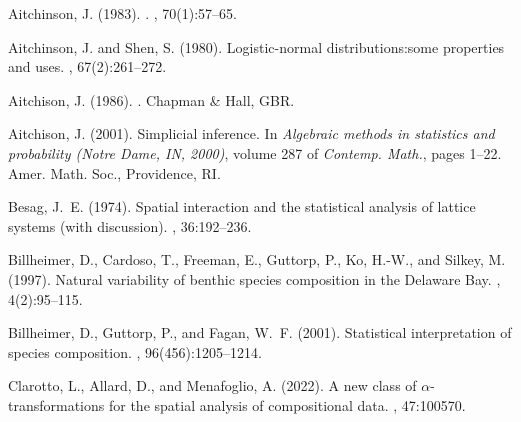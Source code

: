 \documentclass[12pt]{article}
\theoremstyle{plain}
\theoremstyle{definition}
\begin{document}



% 

\begin{thebibliography}{}
	
	Aitchinson, J. (1983).
	.
	, 70(1):57--65.
	
	Aitchinson, J. and Shen, S. (1980).
	\newblock Logistic-normal distributions:some properties and uses.
	, 67(2):261--272.
	
	Aitchison, J. (1986).
	.
	\newblock Chapman \& Hall, GBR.
	
	Aitchison, J. (2001).
	\newblock Simplicial inference.
	\newblock In {\em Algebraic methods in statistics and probability ({N}otre
		{D}ame, {IN}, 2000)}, volume 287 of {\em Contemp. Math.}, pages 1--22. Amer.
	Math. Soc., Providence, RI.
	
	Besag, J.~E. (1974).
	\newblock Spatial interaction and the statistical analysis of lattice systems
	(with discussion).
	, 36:192--236.
	
	Billheimer, D., Cardoso, T., Freeman, E., Guttorp, P., Ko, H.-W., and Silkey,
	M. (1997).
	\newblock Natural variability of benthic species composition in the {Delaware
		Bay}.
	, 4(2):95--115.
	
	Billheimer, D., Guttorp, P., and Fagan, W.~F. (2001).
	\newblock Statistical interpretation of species composition.
	,
	96(456):1205--1214.
	
	Clarotto, L., Allard, D., and Menafoglio, A. (2022).
	\newblock A new class of $\alpha$-transformations for the spatial analysis of
	compositional data.
	, 47:100570.
	

\end{thebibliography}
\end{document}
